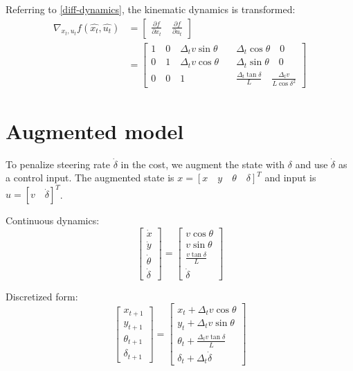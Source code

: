 \documentclass{article}
\begin{document}
Referring to \eqref{diff-dynamics}, the kinematic dynamics is transformed:\\
\begin{equation}
\begin{aligned}
    \nabla_{x_t, u_t} f(\hat{x_t}, \hat{u_t}) & = \begin{bmatrix}
        \frac{\partial{f}}{\partial{x_t}} \quad \frac{\partial{f}}{\partial{u_t}}
    \end{bmatrix}\\
    & = \begin{bmatrix}
        1 \quad 0 \quad \Delta_t v \sin{\theta} \quad & \Delta_t \cos{\theta} \quad 0 \\
        0 \quad 1 \quad \Delta_t v \cos{\theta} \quad & \Delta_t \sin{\theta} \quad 0 \\
        0 \quad 0 \quad            1            \quad & \frac{\Delta_t \tan{\delta}}{L} \quad \frac{\Delta_t v}{L\cos{\delta}^2}
    \end{bmatrix}
\end{aligned}
\end{equation}

\section{Augmented model}
To penalize steering rate $\dot{\delta}$ in the cost, we augment the state with $\delta$ and use $\dot{\delta}$ as a control input. The augmented state is $x = [x \quad y \quad \theta \quad \delta]^T$ and input is $u = [v \quad \dot{\delta}]^T$.

Continuous dynamics:
\begin{equation}
    \begin{bmatrix}
        \dot x\\ \dot y\\ \dot \theta\\ \dot \delta
    \end{bmatrix} = \begin{bmatrix}
        v\cos{\theta}\\
        v\sin{\theta}\\
        \frac{v\tan{\delta}}{L}\\
        \dot{\delta}
    \end{bmatrix}
\end{equation}

Discretized form:
\begin{equation}
    \begin{bmatrix}
        x_{t + 1}\\ y_{t + 1}\\ \theta_{t + 1}\\ \delta_{t + 1}
    \end{bmatrix} = \begin{bmatrix}
        x_t + \Delta_t v\cos{\theta}\\
        y_t + \Delta_t v\sin{\theta}\\
        \theta_t + \frac{\Delta_t v\tan{\delta}}{L}\\
        \delta_t + \Delta_t \dot{\delta}
    \end{bmatrix} \label{augmented-discret-dynamics}
\end{equation}
\end{document}
